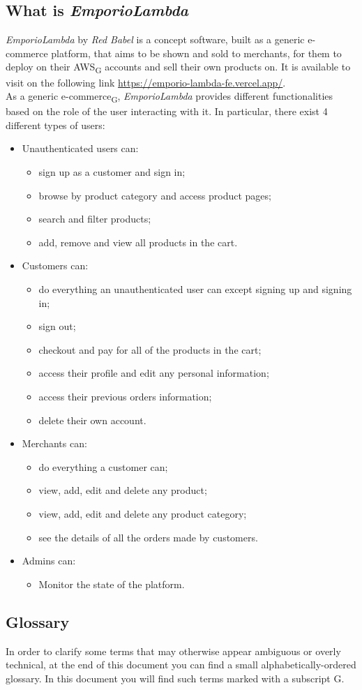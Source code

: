 \subsection{What is \textit{EmporioLambda}}
\textit{EmporioLambda} by \textit{Red Babel} is a concept software, built as a generic e-commerce platform, that aims to be shown and sold to merchants, for them to deploy on their AWS\textsubscript{G} accounts and sell their own products on. It is available to visit on the following link \url{https://emporio-lambda-fe.vercel.app/}.\\
As a generic e-commerce\textsubscript{G}, \textit{EmporioLambda} provides different functionalities based on the role of the user interacting with it. In particular, there exist 4 different types of users:
\begin{itemize}
\item Unauthenticated users can:
\begin{itemize}
\item sign up as a customer and sign in;
\item browse by product category and access product pages;
\item search and filter products;
\item add, remove and view all products in the cart.
\end{itemize}
\item Customers can:
\begin{itemize}
\item do everything an unauthenticated user can except signing up and signing in;
\item sign out;
\item checkout and pay for all of the products in the cart;
\item access their profile and edit any personal information;
\item access their previous orders information;
\item delete their own account.
\end{itemize}
\item Merchants can:
\begin{itemize}
\item do everything a customer can;
\item view, add, edit and delete any product;
\item view, add, edit and delete any product category;
\item see the details of all the orders made by customers.
\end{itemize}
\item Admins can:
\begin{itemize}
\item Monitor the state of the platform.
\end{itemize}
\end{itemize}
\subsection{Glossary}
In order to clarify some terms that may otherwise appear ambiguous or overly technical, at the end of this document you can find a small alphabetically-ordered glossary. In this document you will find such terms marked with a subscript G.

